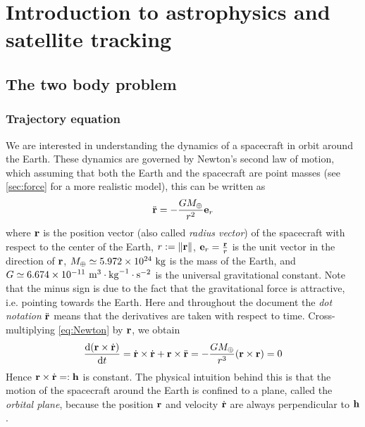 \documentclass[../main.tex]{subfiles}
\begin{document}
\section{Introduction to astrophysics and satellite tracking}
\subsection{The two body problem}\label{sec:twoBody}
\subsubsection{Trajectory equation}
We are interested in understanding the dynamics of a spacecraft in orbit around the Earth. These dynamics are governed by Newton's second law of motion, which assuming that both the Earth and the spacecraft are point masses (see \cref{sec:force} for a more realistic model), this can be written as
\begin{equation}
  \label{eq:Newton}
  \ddot{\boldsymbol{\mathrm{r}}}=-\frac{GM_{\oplus}}{r^2}\boldsymbol{\mathrm{e}}_r
\end{equation}
where $\boldsymbol{\mathrm{r}}$ is the position vector (also called \emph{radius vector}) of the spacecraft with respect to the center of the Earth, $r:=\left\|\boldsymbol{\mathrm{r}}\right\|$, $\boldsymbol{\mathrm{e}}_r=\frac{\boldsymbol{\mathrm{r}}}{r}$ is the unit vector in the direction of $\boldsymbol{\mathrm{r}}$, $M_{\oplus}\simeq 5.972\times 10^{24}\ \kg$ is the mass of the Earth, and $G\simeq 6.674\times 10^{-11}\ \mathrm{m}^3\cdot \mathrm{kg}^{-1}\cdot\mathrm{s}^{-2}$ is the universal gravitational constant. Note that the minus sign is due to the fact that the gravitational force is attractive, i.e. pointing towards the Earth.
Here and throughout the document the \emph{dot notation} $\ddot{\boldsymbol{\mathrm{r}}}$ means that the derivatives are taken with respect to time.
Cross-multiplying \cref{eq:Newton} by $\boldsymbol{\mathrm{r}}$, we obtain
\begin{equation}
  \dv{(\boldsymbol{\mathrm{r}}\times \dot{\boldsymbol{\mathrm{r}}})}{t}=\dot{\boldsymbol{\mathrm{r}}}\times \dot{\boldsymbol{\mathrm{r}}}+\boldsymbol{\mathrm{r}}\times\ddot{\boldsymbol{\mathrm{r}}}=-\frac{GM_{\oplus}}{r^3}(\boldsymbol{\mathrm{r}}\times \boldsymbol{\mathrm{r}})=0
\end{equation}
Hence $\boldsymbol{\mathrm{r}}\times \dot{\boldsymbol{\mathrm{r}}}=:\boldsymbol{\mathrm{h}}$ is constant. The physical intuition behind this is that the motion of the spacecraft around the Earth is confined to a plane, called the \emph{orbital plane}, because the position $\boldsymbol{\mathrm{r}}$ and velocity $\dot{\boldsymbol{\mathrm{r}}}$ are always perpendicular to $\boldsymbol{\mathrm{h}}$.
\end{document}

